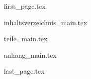\documentclass{skript}
\begin{document}

    {first_page.tex}

    {inhaltsverzeichnis_main.tex}

    {teile_main.tex}

    {anhang_main.tex}

    {last_page.tex}
\end{document}
